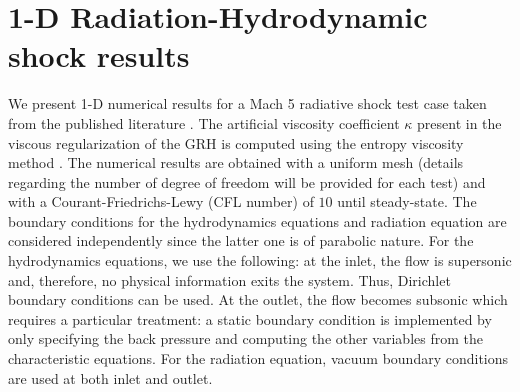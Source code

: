 \documentclass[times,doublespace]{fldauth}%
\begin{document}
\section{1-D Radiation-Hydrodynamic shock results}\label{sec:num-rslt}
%
We present 1-D numerical results for a Mach 5 radiative shock test case taken from the published literature \cite{EdwardsMorelLowrie}. The artificial viscosity coefficient $\kappa$ present in the viscous regularization of the GRH is computed using the entropy viscosity method \cite{jlg1,jlg2,our_jcp_radhy_paper}. The numerical results are obtained with a uniform mesh (details regarding the number of degree of freedom will be provided for each test) and with a Courant-Friedrichs-Lewy (CFL number) of $10$ until steady-state. The boundary conditions for the hydrodynamics equations and radiation equation are considered independently since the latter one is of parabolic nature. For the hydrodynamics equations, we use the following: at the inlet, the flow is supersonic and, therefore, no physical information exits the system. Thus, Dirichlet boundary conditions can be used. At the outlet, the flow becomes subsonic which requires a particular treatment: a static boundary condition is implemented by only specifying the back pressure and computing the other variables from the characteristic equations. For the radiation equation, vacuum boundary conditions are used at both inlet and outlet. 
%
\end{document}
